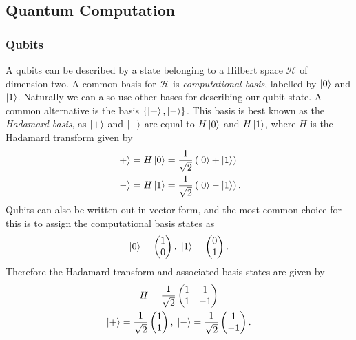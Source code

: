 \subsection{Quantum Computation}
\subsubsection{Qubits}
\label{subsubsection:qubits}
A qubits can be described by a state belonging to a Hilbert space $\mathcal{H}$ of dimension two.
A common basis for $\mathcal{H}$ is \emph{computational basis}, labelled by $\ket{0}$ and $\ket{1}$.
Naturally we can also use other bases for describing our qubit state. A common alternative is the basis $\{\ket{+}, \ket{-}\}$.
This basis is best known as the \emph{Hadamard basis}, as $\ket{+}$ and $\ket{-}$ are equal to $H\ket{0}$ and $H\ket{1}$, where $H$ is the Hadamard transform given by
\begin{align}
    \ket{+} &= H\ket{0} = \frac{1}{\sqrt2} \left(\ket{0} + \ket{1}\right)\\
    \ket{-} &= H\ket{1} = \frac{1}{\sqrt2} \left(\ket{0} - \ket{1}\right).
\end{align}
Qubits can also be written out in vector form, and the most common choice for this is to assign the computational basis states as
\begin{align}
    \ket{0} = 
    \begin{pmatrix}
        1 \\
        0
    \end{pmatrix}, \;
    \ket{1} = 
    \begin{pmatrix}
        0 \\
        1
    \end{pmatrix}.
\end{align}
Therefore the Hadamard transform and associated basis states are given by
\begin{equation}
    \begin{gathered}
        H = \frac{1}{\sqrt{2}}
        \begin{pmatrix}
            1 & 1\\
            1 & -1
        \end{pmatrix}\\
        \ket{+} = \frac{1}{\sqrt{2}}
        \begin{pmatrix}
            1 \\
            1
        \end{pmatrix}, \;
        \ket{-} = \frac{1}{\sqrt{2}}
        \begin{pmatrix}
            1 \\
            -1
        \end{pmatrix}.
    \end{gathered}
\end{equation}

